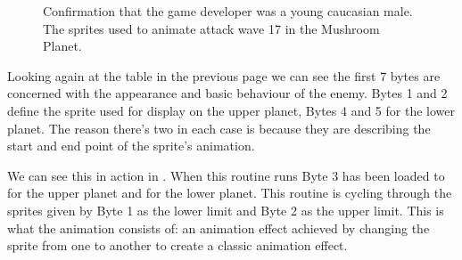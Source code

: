 \begin{figure}[H]
  {
    \setlength{\tabcolsep}{3.0pt}
    \setlength\cmidrulewidth{\heavyrulewidth} %
	\centering
	\def\MULTICOLORONE{red}
	\def\MULTICOLORTWO{white}
	\def\SPRITECOLOR{orange}
	\begin{subfigure}{0.3\textwidth}
		
	\end{subfigure}
	\begin{subfigure}{0.3\textwidth}
		
	\end{subfigure}
	\begin{subfigure}{0.3\textwidth}
		
	\end{subfigure}
  }\caption[position=top]{Confirmation that the game developer was a young caucasian male. The sprites used to animate attack wave 17 in the Mushroom Planet.}
\end{figure}

Looking again at the table in the previous page we can see the first 7 bytes are concerned with the appearance and basic behaviour of the
enemy. Bytes 1 and 2 define the sprite used for display on the upper planet, Bytes 4 and 5
for the lower planet. The reason there's two in each case is because they are describing the
start and end point of the sprite's animation. 

We can see this in action in . When this routine runs Byte 3 has been loaded
to  for the upper planet and 
for the lower planet. This routine is cycling through the sprites given by Byte 1 as the lower limit and Byte 2 as 
the upper limit. This is what the animation consists of: an animation effect achieved by changing the sprite from
one to another to create a classic animation effect.

